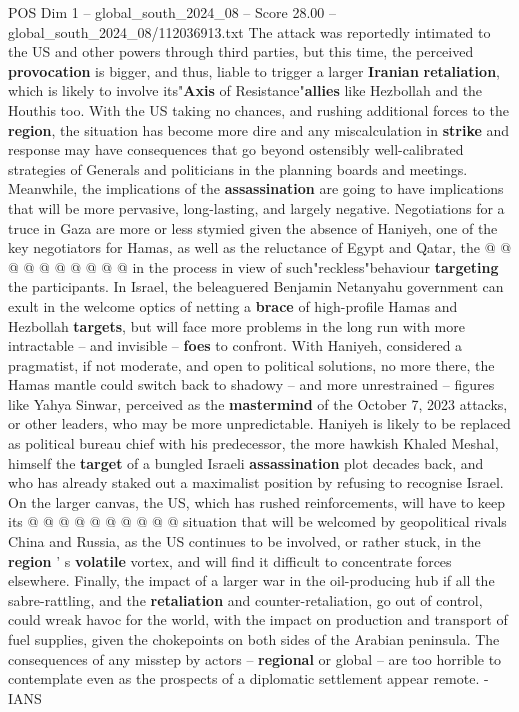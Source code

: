\begin{textsample}{POS Dim 1 – global\_south\_2024\_08 – Score 28.00 – global\_south\_2024\_08/112036913.txt}
The attack was reportedly intimated to the US and other powers through third parties, but this time, the perceived \textbf{provocation} is bigger, and thus, liable to trigger a larger \textbf{Iranian} \textbf{retaliation}, which is likely to involve its"\textbf{Axis} of Resistance"\textbf{allies} like Hezbollah and the Houthis too.
With the US taking no chances, and rushing additional forces to the \textbf{region}, the situation has become more dire and any miscalculation in \textbf{strike} and response may have consequences that go beyond ostensibly well-calibrated strategies of Generals and politicians in the planning boards and meetings.
Meanwhile, the implications of the \textbf{assassination} are going to have implications that will be more pervasive, long-lasting, and largely negative.
Negotiations for a truce in Gaza are more or less stymied given the absence of Haniyeh, one of the key negotiators for Hamas, as well as the reluctance of Egypt and Qatar, the @ @ @ @ @ @ @ @ @ @ in the process in view of such"reckless"behaviour \textbf{targeting} the participants.
In Israel, the beleaguered Benjamin Netanyahu government can exult in the welcome optics of netting a \textbf{brace} of high-profile Hamas and Hezbollah \textbf{targets}, but will face more problems in the long run with more intractable -- and invisible -- \textbf{foes} to confront.
With Haniyeh, considered a pragmatist, if not moderate, and open to political solutions, no more there, the Hamas mantle could switch back to shadowy -- and more unrestrained -- figures like Yahya Sinwar, perceived as the \textbf{mastermind} of the October 7, 2023 attacks, or other leaders, who may be more unpredictable.
Haniyeh is likely to be replaced as political bureau chief with his predecessor, the more hawkish Khaled Meshal, himself the \textbf{target} of a bungled Israeli \textbf{assassination} plot decades back, and who has already staked out a maximalist position by refusing to recognise Israel.
On the larger canvas, the US, which has rushed reinforcements, will have to keep its @ @ @ @ @ @ @ @ @ @ situation that will be welcomed by geopolitical rivals China and Russia, as the US continues to be involved, or rather stuck, in the \textbf{region} ' s \textbf{volatile} vortex, and will find it difficult to concentrate forces elsewhere.
Finally, the impact of a larger war in the oil-producing hub if all the sabre-rattling, and the \textbf{retaliation} and counter-retaliation, go out of control, could wreak havoc for the world, with the impact on production and transport of fuel supplies, given the chokepoints on both sides of the Arabian peninsula.
The consequences of any misstep by actors -- \textbf{regional} or global -- are too horrible to contemplate even as the prospects of a diplomatic settlement appear remote. - IANS

\end{textsample}
